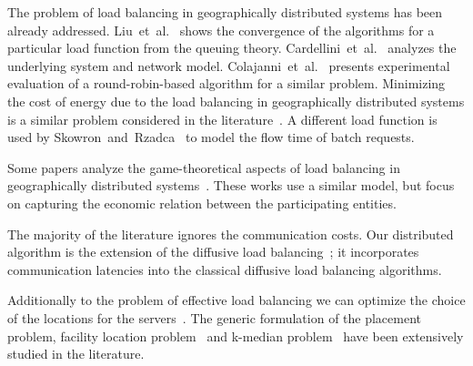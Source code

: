 \documentclass[11pt]{article}
\begin{document}
The problem of load balancing in geographically distributed systems has been already addressed. Liu~et~al.~\cite{Liu:2011:GGL:1993744.1993767} shows the convergence of the algorithms for a particular load function from the queuing theory. 
Cardellini~et~al.~\cite{Cardellini00geographicload} analyzes the underlying system and network model. Colajanni~et~al.~\cite{Colajanni98dynamicload} presents experimental evaluation of a round-robin-based algorithm for a similar problem.
Minimizing the cost of energy due to the load balancing in geographically distributed systems is a similar problem considered in the literature~\cite{Liu:2013:DCD:2494232.2465740, Liu:2011:GLB:2160803.2160862, Lin:2012:OAG:2410145.2410785}. A different load function is used by Skowron~and~Rzadca~\cite{Skowron:2013:NDL:2510648.2510769} to model the flow time of batch requests.

Some papers analyze the game-theoretical aspects of load balancing in geographically distributed systems~\cite{Penmatsa:2006:CLB:1898953.1899089, Grosu:2008:CLB:1455689.1455695, Aote:2009:GMD:1523103.1523153, Grosu:2002:AMD:792762.793282, Adolphs:2012:DSL:2332432.2332460}. These works use a similar model, but focus on capturing the economic relation between the participating entities.

The majority of the literature ignores the communication costs.
Our distributed algorithm is the extension of the diffusive load balancing~\cite{conf/ipps/AdolphsB12, Ackermann:2009:DAQ:1583991.1584046, Berenbrink:2011:DSL:2133036.2133152}; it incorporates communication latencies into the classical diffusive load balancing algorithms.

Additionally to the problem of effective load balancing we can optimize the choice of the locations for the servers~\cite{staticReplicaPlacement1, staticReplicaPlacement2, journals/cj/JiaLHD01}. The generic formulation of the placement problem, facility location problem~\cite{Chudak:2005:IAA:1047770.1047776} and k-median problem~\cite{Jain:2001:AAM:375827.375845} have been extensively studied in the literature.
\end{document}
